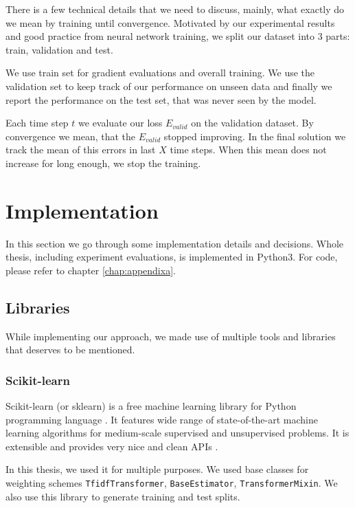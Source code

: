     There is a few technical details that we need to discuss, 
    mainly, what exactly do we mean by training until convergence.
    Motivated by our experimental results and good practice from neural network training,
    we split our dataset into $3$ parts: train, validation and test.
    
    We use train set for gradient evaluations and overall training. 
    We use the validation set to keep track of our performance on unseen data and finally we report the performance on the test set, that was never seen by the model.
    
    Each time step $t$ we evaluate our loss $E_{valid}$ on the validation dataset.
    By convergence we mean, that the $E_{valid}$ stopped improving.
    In the final solution we track the mean of this errors in last $X$ \* %
    time steps.
    When this mean does not increase for long enough, we stop the training.
    
    \section{Implementation}
        
        In this section we go through some implementation details and decisions.
        Whole thesis, including experiment evaluations, is implemented in Python3.
        For code, please refer to chapter \ref{chap:appendixa}.

        \subsection{Libraries} 
    
        While implementing our approach, we made use of multiple tools and libraries that deserves to be mentioned.
    
        \subsubsection{Scikit-learn}
        
        Scikit-learn (or sklearn) is a free machine learning library for Python programming language \cite{scikit-learn}.
        It features wide range of state-of-the-art machine learning algorithms for medium-scale supervised and unsupervised problems.
        It is extensible and provides very nice and clean APIs \cite{sklearn_api}.
        
        In this thesis, we used it for multiple purposes.
        We used base classes for weighting schemes \texttt{TfidfTransformer}, \texttt{BaseEstimator}, \texttt{TransformerMixin}.
        We also use this library to generate training and test splits. 
        
